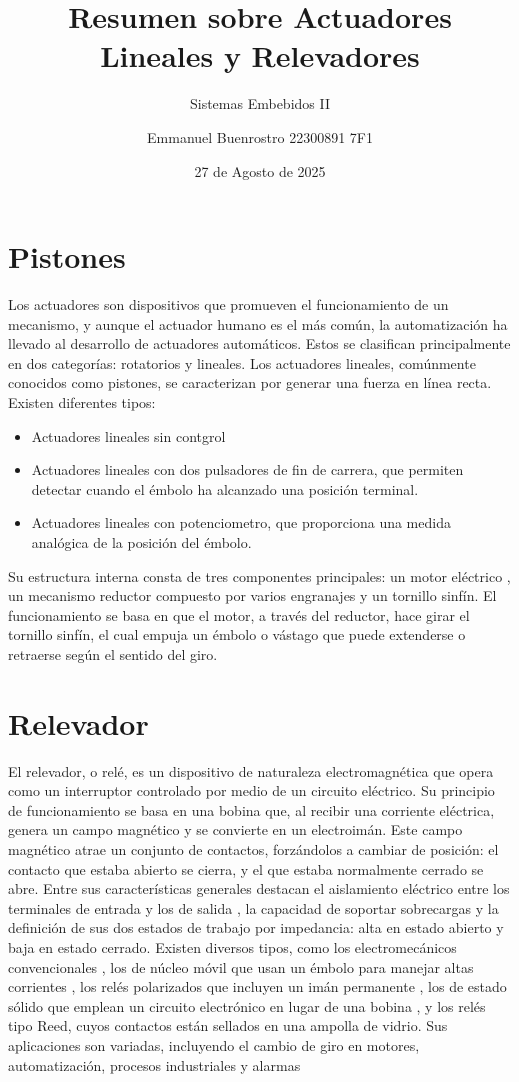 \documentclass[11pt]{scrartcl}
\title {Resumen sobre Actuadores Lineales y Relevadores}
\subtitle{Sistemas Embebidos II}
\date{27 de Agosto de 2025}
\author{Emmanuel Buenrostro 22300891 7F1 }
\begin{document}
\maketitle

\section{Pistones}
Los actuadores son dispositivos que promueven el funcionamiento de un mecanismo, y aunque el actuador humano es el más común, 
la automatización ha llevado al desarrollo de actuadores automáticos. Estos se clasifican principalmente en dos categorías: rotatorios y lineales.
 Los actuadores lineales, comúnmente conocidos como pistones, se caracterizan por generar una fuerza en línea recta. 
 Existen diferentes tipos:
 \begin{itemize}
    \item Actuadores lineales sin contgrol
    \item Actuadores lineales con dos pulsadores de
fin de carrera, que permiten detectar
cuando el émbolo ha alcanzado una
posición terminal.
    \item Actuadores lineales con potenciometro, que proporciona una medida analógica de
la posición del émbolo.
 \end{itemize}
 Su estructura interna consta de tres componentes 
 principales: un motor eléctrico , un mecanismo reductor compuesto por varios engranajes y un tornillo sinfín. 
El funcionamiento se basa en que el motor, a través del reductor, hace girar el tornillo sinfín, el cual empuja un émbolo o vástago que puede extenderse o retraerse según el sentido del giro. 

\section{Relevador}
El relevador, o relé, es un dispositivo de naturaleza electromagnética que opera como un interruptor controlado por medio de un circuito eléctrico. Su principio de funcionamiento se basa en una bobina que, al recibir una corriente eléctrica, genera un campo magnético y se convierte en un electroimán. Este campo magnético atrae un conjunto de contactos, forzándolos a cambiar de posición: el contacto que estaba abierto se cierra, y el que estaba normalmente cerrado se abre. Entre sus características generales destacan el aislamiento eléctrico entre los terminales de entrada y los de salida , la capacidad de soportar sobrecargas y la definición de sus dos estados de trabajo por impedancia: alta en estado abierto y baja en estado cerrado. Existen diversos tipos, como los electromecánicos convencionales , los de núcleo móvil que usan un émbolo para manejar altas corrientes , los relés polarizados que incluyen un imán permanente , los de estado sólido que emplean un circuito electrónico en lugar de una bobina , y los relés tipo Reed, cuyos contactos están sellados en una ampolla de vidrio. Sus aplicaciones son variadas, incluyendo el cambio de giro en motores, automatización, procesos industriales y alarmas
\end{document}
